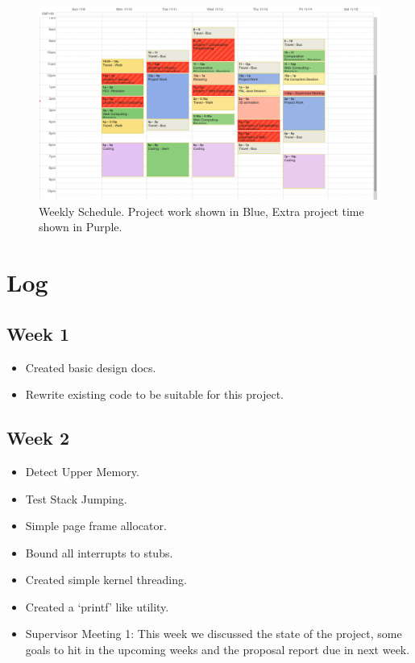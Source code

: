 \documentclass[a4paper]{report}
\begin{document}
\begin{figure}[ht]
\centering
\includegraphics[width=450px]{images/schedule_screenshot}
\caption{Weekly Schedule. Project work shown in Blue, Extra project time shown in Purple.}
\label{fig:schedulerscreen}
\end{figure}


\chapter{Log}


\section{Week 1}
\begin{itemize}
\item Created basic design docs.
\item Rewrite existing code to be suitable for this project.
\end{itemize}

\section{Week 2}
\begin{itemize}
\item Detect Upper Memory.
\item Test Stack Jumping.
\item Simple page frame allocator.
\item Bound all interrupts to stubs.
\item Created simple kernel threading.
\item Created a `printf' like utility.
\item Supervisor Meeting 1: This week we discussed the state of the project, some goals to hit in the upcoming weeks and the proposal report due in next week.
\end{itemize}
\end{document}
